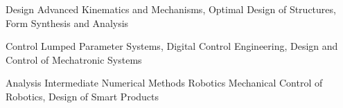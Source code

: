 

\begin{cvskills}

  \cvskill
    {Design} %
    {Advanced Kinematics and Mechanisms, Optimal Design of Structures, Form Synthesis and Analysis} %

  \cvskill
    {Control} %
    {Lumped Parameter Systems, Digital Control Engineering, Design and Control of Mechatronic Systems} %
    
 \cvskill
 	{Analysis} %
 	{Intermediate Numerical Methods} %
 \cvskill
 	{Robotics} %
 	{Mechanical Control of Robotics, Design of Smart Products} %

\end{cvskills}
